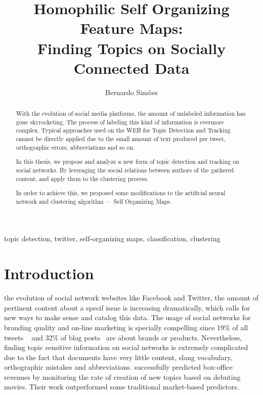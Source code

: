 \documentclass[journal]{IEEEtran}
\begin{document}
%
\title{Homophilic Self Organizing Feature Maps:\\ Finding Topics on Socially Connected Data}

\author{Bernardo Simões}

\maketitle

\begin{abstract}
With the evolution of social media platforms, the amount of unlabeled information has gone skyrocketing. The process of labeling this kind of information is evermore complex. Typical approaches used on the WEB for Topic Detection and Tracking cannot be directly applied due to the small amount of text produced per tweet, orthographic errors, abbreviations and so on.

In this thesis, we propose and analyze a new form of topic detection and tracking on social networks. By leveraging the social relations between authors of the gathered content, and apply them to the clustering process.

In order to achieve this, we proposed some modifications to the artificial neural network  and clustering algorithm --- Self Organizing Maps. 
\end{abstract}

\begin{IEEEkeywords}
topic detection, twitter, self-organizing maps, classification, clustering
\end{IEEEkeywords}

\section{Introduction}
 the evolution of social network websites like Facebook and Twitter, the amount of pertinent content about a specif issue is increasing dramatically, which calls for new ways to make sense and catalog this data.
The usage of social networks for branding quality and on-line marketing is specially compelling since 19\% of all tweets ~\cite{Jansen2009} and 32\% of blog posts~\cite{Melville2009} are about brands or products. Nevertheless, finding topic sensitive information on social networks is extremely complicated due to the fact that documents have very little content, slang vocabulary, orthographic mistakes and abbreviations. \citet{Asur2010} successfully predicted box-office revenues by monitoring the rate of creation of new topics based on debuting movies. Their work outperformed some traditional market-based predictors.
\end{document}
